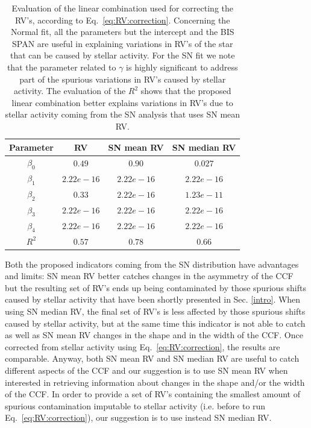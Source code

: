 \documentclass[11pt, oneside]{article}
\begin{document}
\begin{table}
\centering
\begin{tabular}{|c|c|c|c|}
\hline
Parameter          & RV         &   SN mean RV &   SN median RV \\
\hline
$\beta_{0}$            &    $0.49$    & $0.90 $  & $0.027$ \\
\hline
$\beta_{1}$            &    $2.22e-16$    & $2.22e-16 $  & $2.22e-16$ \\
\hline
$\beta_{2}$            &     $0.33$   & $2.22e-16 $ & $1.23e-11$\\
\hline
$\beta_{3}$            &     $ 2.22e-16$   &  $2.22e-16 $  & $ 2.22e-16$\\
\hline
$\beta_{4}$            &     $2.22e-16$   &  $2.22e-16 $ & $ 2.22e-16 $\\
\hline
$R^{2}$      &     $0.57$    &  $0.78$ & $0.66$  \\
\hline
\end{tabular}
\caption{Evaluation of the linear combination used for correcting the RV's, according to Eq.~\ref{eq:RV:correction}. Concerning the Normal fit, all the parameters but the intercept and the BIS SPAN are useful in explaining variations in RV's of the star that can be caused by stellar activity. For the SN fit we note that the parameter related to $\gamma$ is highly significant to address part of the spurious variations in RV's caused by stellar activity. The evaluation of the $R^2$ shows that the proposed linear combination better explains variations in RV's due to stellar activity coming from the SN analysis that uses SN mean RV.}
\label{table:alphacent.test}
\end{table}

Both the proposed indicators coming from the SN distribution have advantages and limits: SN mean RV better catches changes in the asymmetry of the CCF but the resulting set of RV's ends up being contaminated by those spurious shifts caused by stellar activity that have been shortly presented in Sec. \ref{intro}. When using SN median RV, the final set of RV's is less affected by those spurious shifts caused by stellar activity, but at the same time this indicator is not able to catch as well as SN mean RV changes in the shape and in the width of the CCF. Once corrected from stellar activity using Eq.~\ref{eq:RV:correction}, the results are comparable. Anyway, both SN mean RV and SN median RV are useful to catch different aspects of the CCF and our suggestion is to use SN mean RV when interested in retrieving information about changes in the shape and/or the width of the CCF. In order to provide a set of RV's containing the smallest amount of spurious contamination imputable to stellar activity (i.e. before to run Eq.~\ref{eq:RV:correction}), our suggestion is to use instead SN median RV. 
\end{document}
